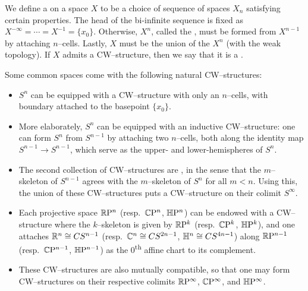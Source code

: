 \begin{definition}
We define a  on a space $X$ to be a choice of sequence of spaces $X_n$ satisfying certain properties.
The head of the bi-infinite sequence is fixed as $X^{-\infty} = \cdots = X^{-1} = \{x_0\}$.
Otherwise, $X^n$, called the , must be formed from $X^{n-1}$ by attaching $n$--cells.
Lastly, $X$ must be the union of the $X^n$ (with the weak topology).
If $X$ admits a CW--structure, then we say that it is a .
\end{definition}

\begin{example}
Some common spaces come with the following natural CW--structures:
\begin{itemize}
    \item $S^n$ can be equipped with a CW--structure with only an $n$--cells, with boundary attached to the basepoint $\{x_0\}$.
    \item More elaborately, $S^n$ can be equipped with an inductive CW--structure: one can form $S^n$ from $S^{n-1}$ by attaching two $n$--cells, both along the identity map $S^{n-1} \to S^{n-1}$, which serve as the upper- and lower-hemispheres of $S^n$.
    \item The second collection of CW--structures are , in the sense that the $m$--skeleton of $S^{n-1}$ agrees with the $m$--skeleton of $S^n$ for all $m < n$.  Using this, the union of these CW--structures puts a CW--structure on their colimit $S^\infty$.
    \item Each projective space $\mathbb R \mathrm{P}^n$ (resp.\ $\mathbb C \mathrm{P}^n$, $\mathbb H \mathrm{P}^n$) can be endowed with a CW--structure where the $k$--skeleton is given by $\mathbb R \mathrm{P}^k$ (resp.\ $\mathbb C \mathrm{P}^k$, $\mathbb H \mathrm{P}^k$), and one attaches $\mathbb R^n \cong CS^{n-1}$ (resp.\ $\mathbb C^n \cong CS^{2n-1}$, $\mathbb H^n \cong CS^{4n-1}$) along $\mathbb R \mathrm{P}^{n-1}$ (resp.\ $\mathbb C \mathrm{P}^{n-1}$, $\mathbb H \mathrm{P}^{n-1}$) as the $0$\textsuperscript{th} affine chart to its complement.
    \item These CW--structures are also mutually compatible, so that one may form CW--structures on their respective colimits $\mathbb R \mathrm{P}^\infty$, $\mathbb C \mathrm{P}^\infty$, and $\mathbb H \mathrm{P}^\infty$.
\end{itemize}
\end{example}

